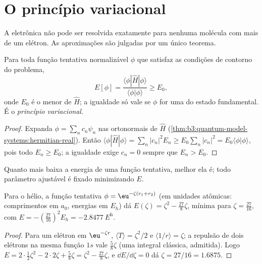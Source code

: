 \section{O princípio variacional}

A  eletrônica não pode ser resolvida exatamente para
nenhuma molécula com mais de um elétron. As aproximações são julgadas por um
único teorema.

\begin{theorem}\label{thm:b3:computational-chemistry:variational}
Para toda função tentativa normalizável $\phi$ que satisfaz as condições de
contorno do problema,
\[
E[\phi] = \frac{\langle\phi|\hat H|\phi\rangle}{\langle\phi|\phi\rangle} \ge E_0,
\]
onde $E_0$ é o menor  de $\hat H$; a igualdade só vale se $\phi$
for uma  do estado fundamental. É o \emph{princípio
variacional}.
\end{theorem}

\begin{proof}
Expanda $\phi = \sum_nc_n\psi_n$ nas  ortonormais de $\hat H$
(\cref{thm:b3:quantum-model-systems:hermitian-real}). Então $\langle\phi|\hat
H|\phi\rangle = \sum_n|c_n|^2E_n \ge E_0\sum_n|c_n|^2 = E_0\langle\phi|\phi\rangle$,
pois todo $E_n \ge E_0$; a igualdade exige $c_n = 0$ sempre que $E_n > E_0$.
\end{proof}

Quanto mais baixa a energia de uma função tentativa, melhor ela é; todo
parâmetro ajustável é fixado minimizando $E$.

\begin{proposition}\label{prop:b3:computational-chemistry:helium-zeta}
Para o hélio, a função tentativa $\phi = \eu^{-\zeta(r_1 + r_2)}$ (em unidades atômicas:
comprimentos em $a_0$, energias em $E_h$) dá $E(\zeta) = \zeta^2 - \frac{27}{8}\zeta$,
mínima para $\zeta = \frac{27}{16}$, com $E = -(\frac{27}{16})^2 E_h =
\qty{-2.8477}{\hartree}$.
\end{proposition}

\begin{proof}
Para um elétron em $\eu^{-\zeta r}$, $\langle T\rangle = \zeta^2/2$ e
$\langle 1/r\rangle = \zeta$; a repulsão de dois elétrons na mesma função $1s$
vale $\frac58\zeta$ (uma integral clássica, admitida). Logo $E = 2\cdot\frac12
\zeta^2 - 2\cdot2\zeta + \frac58\zeta = \zeta^2 - \frac{27}{8}\zeta$, e $\dd E/\dd
\zeta = 0$ dá $\zeta = 27/16 = 1.6875$.
\end{proof}

